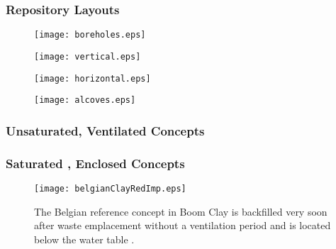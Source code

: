 \begin{frame}
  \frametitle{Repository Layouts}

  \begin{minipage}{0.49\textwidth}
    \begin{figure}[h!]
      \texttt{[image: boreholes.eps]}
    \end{figure}
    \begin{figure}[h!]
      \texttt{[image: vertical.eps]}
    \end{figure}
  \end{minipage}
  \hspace{0.01cm}
  \begin{minipage}{0.49\textwidth}
    \begin{figure}[h!]
      \texttt{[image: horizontal.eps]}
    \end{figure}
    \begin{figure}[h!]
      \texttt{[image: alcoves.eps]}
    \end{figure}
  \end{minipage}

\end{frame}

\begin{frame}[ctb!]
  \footnotesize{
  \frametitle{Unsaturated, Ventilated Concepts}
  
}
\end{frame}

\begin{frame}[ctb!]
  \footnotesize{
  \frametitle{Saturated , Enclosed Concepts} 
 \begin{figure}[h!]
    \begin{center}
      \texttt{[image: belgianClayRedImp.eps]}
    \end{center}
    \caption{The Belgian reference concept in Boom Clay is backfilled very soon
   after waste emplacement without a ventilation period and is located below the water table
   \cite{von_lensa_red-impact_2008}.}
    \label{fig:belgianClayRedImp}
  \end{figure}
}
\end{frame}
